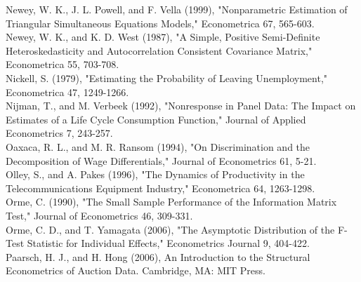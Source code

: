 \documentclass[10pt]{article}
\begin{document}
Newey, W. K., J. L. Powell, and F. Vella (1999), "Nonparametric Estimation of Triangular Simultaneous Equations Models," Econometrica 67, 565-603.\\
Newey, W. K., and K. D. West (1987), "A Simple, Positive Semi-Definite Heteroskedasticity and Autocorrelation Consistent Covariance Matrix," Econometrica 55, 703-708.\\
Nickell, S. (1979), "Estimating the Probability of Leaving Unemployment," Econometrica 47, 1249-1266.\\
Nijman, T., and M. Verbeek (1992), "Nonresponse in Panel Data: The Impact on Estimates of a Life Cycle Consumption Function," Journal of Applied Econometrics 7, 243-257.\\
Oaxaca, R. L., and M. R. Ransom (1994), "On Discrimination and the Decomposition of Wage Differentials," Journal of Econometrics 61, 5-21.\\
Olley, S., and A. Pakes (1996), "The Dynamics of Productivity in the Telecommunications Equipment Industry," Econometrica 64, 1263-1298.\\
Orme, C. (1990), "The Small Sample Performance of the Information Matrix Test," Journal of Econometrics 46, 309-331.\\
Orme, C. D., and T. Yamagata (2006), "The Asymptotic Distribution of the F-Test Statistic for Individual Effects," Econometrics Journal 9, 404-422.\\
Paarsch, H. J., and H. Hong (2006), An Introduction to the Structural Econometrics of Auction Data. Cambridge, MA: MIT Press.
\end{document}
